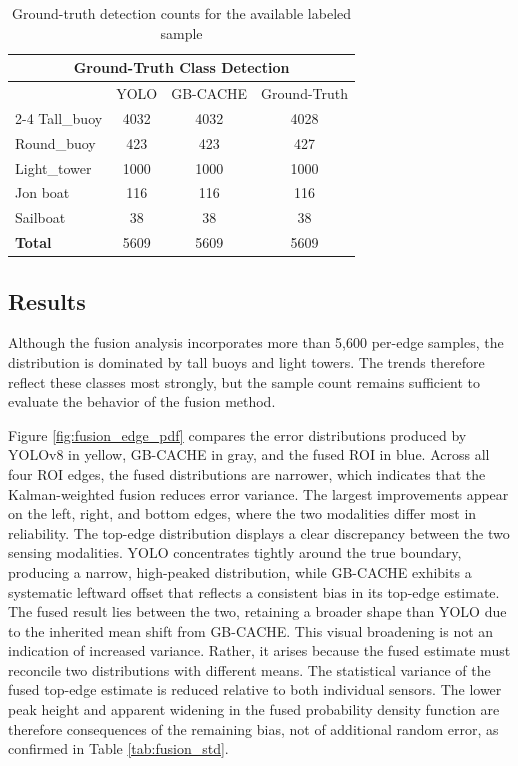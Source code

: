 \documentclass{erauthesis}
\begin{document}
\begin{table}[htpb]
\centering
\begin{tabular}{lccc}
\hline
\multicolumn{4}{c}{Ground-Truth Class Detection}\\
\hline
\hline
            & YOLO & GB-CACHE & Ground-Truth \\ \cline{2-4} 
Tall\_buoy   & 4032  & 4032      & 4028          \\
Round\_buoy     & 423   & 423        & 427           \\
Light\_tower & 1000   & 1000       & 1000           \\
Jon boat    & 116    & 116        & 116            \\
Sailboat    & 38    & 38        & 38            \\
\hline
\textbf{Total}       & 5609  & 5609      & 5609      \\
\hline
\end{tabular}
\caption{Ground-truth detection counts for the available labeled sample}
\label{tab:gt-detect}
\end{table}



\subsection{Results} \label{fusion_results}

Although the fusion analysis incorporates more than 5,600 per-edge samples, the distribution is dominated by tall buoys and light towers. The trends therefore reflect these classes most strongly, but the sample count remains sufficient to evaluate the behavior of the fusion method.

Figure \ref{fig:fusion_edge_pdf} compares the error distributions produced by YOLOv8 in yellow, GB-CACHE in gray, and the fused ROI in blue. Across all four ROI edges, the fused distributions are narrower, which indicates that the Kalman-weighted fusion reduces error variance. The largest improvements appear on the left, right, and bottom edges, where the two modalities differ most in reliability. 
The top-edge distribution displays a clear discrepancy between the two sensing modalities. YOLO concentrates tightly around the true boundary, producing a narrow, high-peaked distribution, while GB-CACHE exhibits a systematic leftward offset that reflects a consistent bias in its top-edge estimate. The fused result lies between the two, retaining a broader shape than YOLO due to the inherited mean shift from GB-CACHE. This visual broadening is not an indication of increased variance. Rather, it arises because the fused estimate must reconcile two distributions with different means.
The statistical variance of the fused top-edge estimate is reduced relative to both individual sensors. The lower peak height and apparent widening in the fused probability density function are therefore consequences of the remaining bias, not of additional random error,  as confirmed in Table \ref{tab:fusion_std}.
\end{document}
